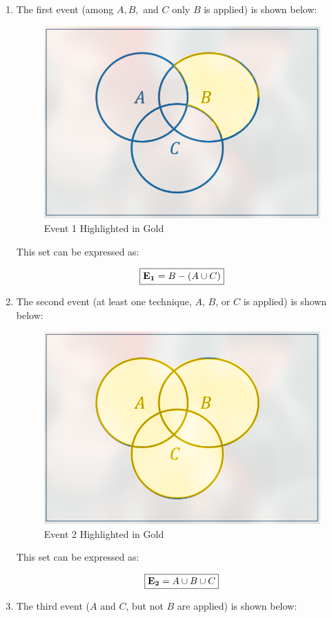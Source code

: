 \begin{enumerate}
\begin{enumerate}
      \item The first event (among $A,B,$ and $C$ only $B$ is applied) is shown below:

        \begin{figure}[H]
          \centering
          \includegraphics[width=.7\textwidth]{Figures/HW1-6a}
          \caption{Event 1 Highlighted in Gold}
          \label{fig:1}
        \end{figure}

        This set can be expressed as:

        $$\boxed{\bold{E_1}=B- (A\cup C)}$$

      \item The second event (at least one technique, $A$, $B$, or $C$ is applied) is shown below:

        \begin{figure}[H]
          \centering
          \includegraphics[width=.7\textwidth]{Figures/HW1-6b}
          \caption{Event 2 Highlighted in Gold}
          \label{fig:2}
        \end{figure}

        This set can be expressed as:

        $$\boxed{\bold{E_2}=A\cup B\cup C}$$

      \item The third event ($A$ and $C$, but not $B$ are applied) is shown below:


\end{enumerate}
\end{enumerate}
